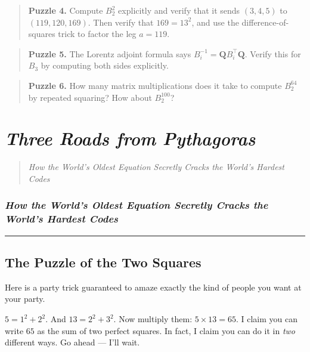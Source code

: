\documentclass[11pt,openany]{book}
\theoremstyle{definition}
\theoremstyle{plain}
\theoremstyle{remark}
\begin{document}
\begin{quote}
\textbf{Puzzle 4.} Compute $B_2^2$ explicitly and verify that it sends $(3, 4, 5)$ to $(119, 120, 169)$. Then verify that $169 = 13^2$, and use the difference-of-squares trick to factor the leg $a = 119$.
\end{quote}


\begin{quote}
\textbf{Puzzle 5.} The Lorentz adjoint formula says $B_i^{-1} = \mathbf{Q} B_i^\top \mathbf{Q}$. Verify this for $B_3$ by computing both sides explicitly.
\end{quote}


\begin{quote}
\textbf{Puzzle 6.} How many matrix multiplications does it take to compute $B_2^{64}$ by repeated squaring? How about $B_2^{100}$?
\end{quote}


\clearpage

\chapter{\textit{Three Roads from Pythagoras}}
\begin{quote}\textit{How the World's Oldest Equation Secretly Cracks the World's Hardest Codes}\end{quote}



\subsection*{\textit{How the World's Oldest Equation Secretly Cracks the World's Hardest Codes}}


\bigskip\noindent\rule{\textwidth}{0.4pt}\bigskip


\section*{The Puzzle of the Two Squares}


Here is a party trick guaranteed to amaze exactly the kind of people you want at your party.

$5 = 1^2 + 2^2$. And $13 = 2^2 + 3^2$. Now multiply them: $5 \times 13 = 65$. I claim you can write $65$ as the sum of two perfect squares. In fact, I claim you can do it in \textit{two} different ways. Go ahead — I'll wait.
\end{document}
